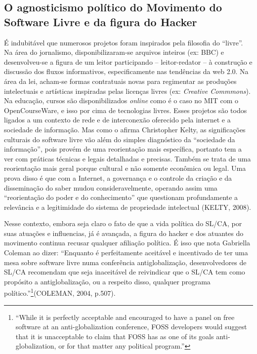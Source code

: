 \subsection{O agnosticismo político do Movimento do Software Livre e da figura do Hacker} \label{2.2.1}

É indubitável que numerosos projetos foram inspirados pela filosofia do “livre”. Na área do jornalismo, disponibilizaram-se arquivos inteiros (ex: BBC) e desenvolveu-se a figura de um leitor participando – leitor-redator – à construção e discussão dos fluxos informativos, especificamente nas tendências da web 2.0. Na área da lei, acham-se formas contratuais novas para regimentar as produções intelectuais e artísticas inspiradas pelas licenças livres (ex: \emph{Creative Commmons}). Na educação, cursos são disponibilizados \emph{online} como é o caso no MIT com o OpenCourseWare, e isso por cima de tecnologias livres. Esses projetos são todos ligados a um contexto de rede e de interconexão oferecido pela internet e a sociedade de informação. Mas como o afirma Christopher Kelty, as significações culturais do software livre vão além do simples diagnóstico da “sociedade da informação”, pois provém de uma reorientação mais específica, portanto tem a ver com práticas técnicas e legais detalhadas e precisas. Também se trata de uma reorientação mais geral porque cultural e não somente econômica ou legal. Uma prova disso é que com a Internet, a governança e o controle da criação e da disseminação do saber mudou consideravelmente, operando assim uma “reorientação do poder e do conhecimento” que questionam profundamente a relevância e a legitimidade do sistema de propriedade intelectual (KELTY, 2008).

Nesse contexto, embora seja claro o fato de que a vida política do SL/CA, por suas atuações e influencias, já é avançada, a figura do hacker e dos atuantes do movimento continua recusar qualquer afiliação política. É isso que nota Gabriella Coleman ao dizer: “Enquanto é perfeitamente aceitável e incentivado de ter uma mesa sobre software livre numa conferência antiglobalização, desenvolvedores de SL/CA recomendam que seja inaceitável de reivindicar que o SL/CA tem como propósito a antiglobalização, ou a respeito disso, qualquer programa político.”\footnote{“While it is perfectly acceptable and encouraged to have a panel on free software at an anti-globalization conference, FOSS developers would suggest that it is unacceptable to claim that FOSS has as one of its goals anti-globalization, or for that matter any political program.”}(COLEMAN, 2004, p.507).

